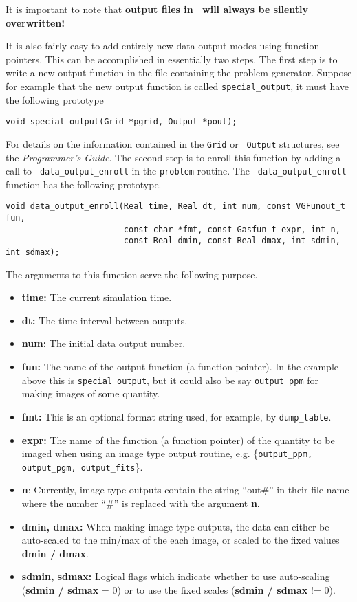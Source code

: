It is important to note that {\bf output files in \ath\ will always be
silently overwritten!} 

It is also fairly easy to add entirely new data output modes using
function pointers. This can be accomplished in essentially two steps.
The first step is to write a new output function in the file
containing the problem generator.  Suppose for example that the new
output function is called {\tt special\_output}, it must have the
following prototype

\footnotesize
\begin{verbatim}
void special_output(Grid *pgrid, Output *pout);
\end{verbatim}
\normalsize
\noindent
For details on the information contained in the {\tt Grid} or {\tt
Output} structures, see the {\it Programmer's Guide}.  The second step
is to enroll this function by adding a call to {\tt
data\_output\_enroll} in the {\tt problem} routine.  The {\tt
data\_output\_enroll} function has the following prototype.

\footnotesize
\begin{verbatim}
void data_output_enroll(Real time, Real dt, int num, const VGFunout_t fun,
                        const char *fmt, const Gasfun_t expr, int n,
                        const Real dmin, const Real dmax, int sdmin, int sdmax);
\end{verbatim}
\normalsize

\noindent
The arguments to this function serve the following purpose.
\begin{itemize}
\item {\bf time:} The current simulation time.
\item {\bf dt:} The time interval between outputs.
\item {\bf num:} The initial data output number.
\item {\bf fun:} The name of the output function (a function pointer).  In
  the example above this is {\tt special\_output}, but it could also
  be say {\tt output\_ppm} for making images of some quantity.
\item {\bf fmt:} This is an optional format string used, for example,
  by {\tt dump\_table}.
\item {\bf expr:} The name of the function (a function pointer) of the
  quantity to be imaged when using an image type output routine,
  e.g. \{{\tt output\_ppm, output\_pgm, output\_fits}\}.
\item {\bf n}: Currently, image type outputs contain the string ``out\#'' 
in their file-name where the number ``\#'' is replaced with the argument 
{\bf n}.
\item {\bf dmin, dmax:} When making image type outputs, the data can 
either be auto-scaled to the min/max of the each image, or scaled to
the fixed values {\bf dmin / dmax}.
\item {\bf sdmin, sdmax:} Logical flags which indicate whether to use
auto-scaling ({\bf sdmin / sdmax} = 0) or to use the fixed scales
({\bf sdmin / sdmax} != 0).
\end{itemize}

